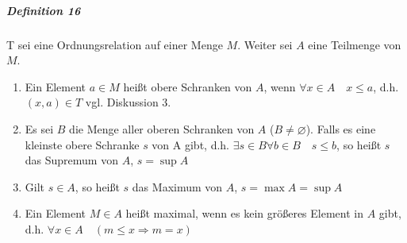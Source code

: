 \documentclass[a4paper]{scrartcl}
\begin{document}
\subparagraph{Definition 16} T sei eine Ordnungsrelation auf einer Menge $M$. Weiter sei $A$ eine Teilmenge von $M$.
\begin{enumerate}
\item Ein Element $a \in M$ heißt obere Schranken von $A$, wenn $\forall x \in A \quad x \leq a$, d.h. $(x,a) \in T$ vgl. Diskussion 3.
\item Es sei $B$ die Menge aller oberen Schranken von $A$ ($B\neq \varnothing$). Falls es eine kleinste obere Schranke $s$ von A gibt, d.h.
$\exists s \in B \forall b \in B \quad s\leq b$, so heißt $s$ das Supremum von $A$, $s = \sup{A}$
\item Gilt $s\in A$, so heißt $s$ das Maximum von $A$, $s=\max{A} = \sup{A}$
\item Ein Element $M \in A$ heißt maximal, wenn es kein größeres Element in $A$ gibt, d.h. $\forall x\in A \quad ( m \leq x \Rightarrow m=x)$

\end{enumerate}
\end{document}
